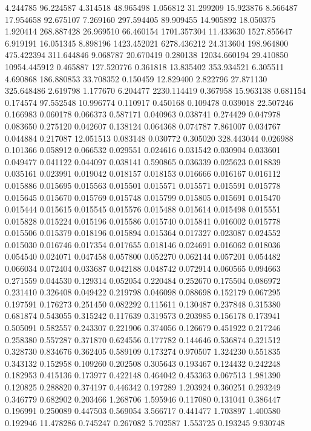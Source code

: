 4.244785
96.224587
4.314518
48.965498
1.056812
31.299209
15.923876
8.566487
17.954658
92.675107
7.269160
297.594405
89.909455
14.905892
18.050375
1.920414
268.887428
26.969510
66.460154
1701.357304
11.433630
1527.855647
6.919191
16.051345
8.898196
1423.452021
6278.436212
24.313604
198.964800
475.422394
311.644846
9.068787
20.670419
0.280138
12034.660194
29.410850
10954.445912
0.465887
127.520776
0.361818
13.835402
353.934521
6.305511
4.690868
186.880853
33.708352
0.150459
12.829400
2.822796
27.871130
325.648486
2.619798
1.177670
6.204477
2230.114419
0.367958
15.963138
0.681154
0.174574
97.552548
10.996774
0.110917
0.450168
0.109478
0.039018
22.507246
0.166983
0.060178
0.066373
0.587171
0.040963
0.038741
0.274429
0.047978
0.083650
0.275120
0.042607
0.138124
0.064368
0.074787
7.861007
0.034767
0.044884
0.217087
12.051513
0.083148
0.030772
0.305020
328.443044
0.026988
0.101366
0.058912
0.066532
0.029551
0.024616
0.031542
0.030904
0.033601
0.049477
0.041122
0.044097
0.038141
0.590865
0.036339
0.025623
0.018839
0.035161
0.023991
0.019042
0.018157
0.018153
0.016666
0.016167
0.016112
0.015886
0.015695
0.015563
0.015501
0.015571
0.015571
0.015591
0.015778
0.015645
0.015670
0.015769
0.015748
0.015799
0.015805
0.015691
0.015470
0.015444
0.015615
0.015545
0.015576
0.015488
0.015614
0.015498
0.015551
0.015828
0.015224
0.015196
0.015586
0.015740
0.015841
0.016002
0.015778
0.015506
0.015379
0.018196
0.015894
0.015364
0.017327
0.023087
0.024552
0.015030
0.016746
0.017354
0.017655
0.018146
0.024691
0.016062
0.018036
0.054540
0.024071
0.047458
0.057800
0.052270
0.062144
0.057201
0.054482
0.066034
0.072404
0.033687
0.042188
0.048742
0.072914
0.060565
0.094663
0.271559
0.044530
0.129314
0.052054
0.220484
0.252670
0.175504
0.086972
0.231410
0.326408
0.049422
0.219798
0.046098
0.088698
0.152179
0.067295
0.197591
0.176273
0.251450
0.082292
0.115611
0.130487
0.237848
0.315380
0.681874
0.543055
0.315242
0.117639
0.319573
0.203985
0.156178
0.173941
0.505091
0.582557
0.243307
0.221906
0.374056
0.126679
0.451922
0.217246
0.258380
0.557287
0.371870
0.624556
0.177782
0.144646
0.536874
0.321512
0.328730
0.834676
0.362405
0.589109
0.173274
0.970507
1.324230
0.551835
0.343132
0.152958
0.109260
0.202508
0.305643
0.193467
0.124432
0.242248
0.182953
0.415136
0.173977
0.422148
0.464042
0.453363
0.067513
1.981390
0.120825
0.288820
0.374197
0.446342
0.197289
1.203924
0.360251
0.293249
0.346779
0.682902
0.203466
1.268706
1.595946
0.117080
0.131041
0.386447
0.196991
0.250089
0.447503
0.569054
3.566717
0.441477
1.703897
1.400580
0.192946
11.478286
0.745247
0.267082
5.702587
1.553725
0.193245
9.930748
